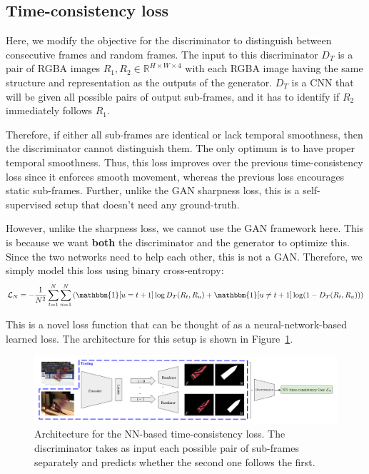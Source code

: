 \subsection{Time-consistency loss}
    Here, we modify the objective for the discriminator to distinguish between consecutive frames and random frames.
    The input to this discriminator $D_T$ is a pair of RGBA images $R_1, R_2 \in \mathbb{R}^{H \times W \times 4}$ with each RGBA image having the same structure and representation as the outputs of the generator.
    $D_T$ is a CNN that will be given all possible pairs of output sub-frames, and it has to identify if $R_2$ immediately follows $R_1$.

    Therefore, if either all sub-frames are identical or lack temporal smoothness, then the discriminator cannot distinguish them.
    The only optimum is to have proper temporal smoothness.
    Thus, this loss improves over the previous time-consistency loss since it enforces smooth movement, whereas the previous loss encourages static sub-frames.
    Further, unlike the GAN sharpness loss, this is a self-supervised setup that doesn't need any ground-truth.

    However, unlike the sharpness loss, we cannot use the GAN framework here.
    This is because we want \textbf{both} the discriminator and the generator to optimize this.
    Since the two networks need to help each other, this is not a GAN.\@
    Therefore, we simply model this loss using binary cross-entropy:
    \begin{equation}
        \mathcal{L}_N = - \frac{1}{N^2} \sum_{t=1}^N \sum_{u=1}^N \left( \mathbbm{1}[u=t+1] \log D_T(R_t, R_u) + \mathbbm{1}[u \neq t+1] \log (1 - D_T(R_t, R_u)) \right)
    \end{equation}

    This is a novel loss function that can be thought of as a neural-network-based learned loss.
    The architecture for this setup is shown in Figure~\ref{fig:temp-nn-arch}.

    \begin{figure}
        \centering
        \includegraphics[width=\textwidth]{images/temp-nn-arch.png}
        \caption{
            Architecture for the NN-based time-consistency loss.
            The discriminator takes as input each possible pair of sub-frames separately and predicts whether the second one follows the first.
        }%
        \label{fig:temp-nn-arch}
    \end{figure}

